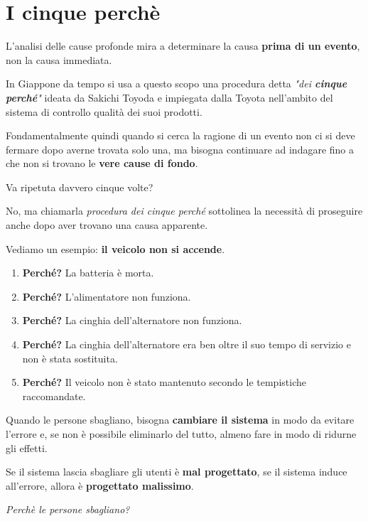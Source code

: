 \documentclass[a4paper,11pt,oneside]{book}
\begin{document}
\section{I cinque perchè}

L'analisi delle cause profonde mira a determinare la causa \textbf{prima di un evento}, non la causa immediata.

In Giappone da tempo si usa a questo scopo una procedura detta \textit{"dei \textbf{cinque perché}"} ideata da Sakichi Toyoda e impiegata dalla Toyota nell'ambito del sistema di controllo qualità dei suoi prodotti.

Fondamentalmente quindi quando si cerca la ragione di un evento non ci si deve fermare dopo averne trovata solo una, ma bisogna continuare ad indagare fino a che non si trovano le \textbf{vere cause di fondo}.

Va ripetuta davvero cinque volte?

No, ma chiamarla \textit{procedura dei cinque perché} sottolinea la necessità di proseguire anche dopo aver trovano una causa apparente.

Vediamo un esempio: \textbf{il veicolo non si accende}.

\begin{enumerate}
	\item \textbf{Perché?} La batteria è morta.
	\item \textbf{Perché?} L'alimentatore non funziona.
	\item \textbf{Perché?} La cinghia dell'alternatore non funziona.
	\item \textbf{Perché?} La cinghia dell'alternatore era ben oltre il suo tempo di servizio e non è stata sostituita.
	\item \textbf{Perché?} Il veicolo non è stato mantenuto secondo le tempistiche raccomandate.
\end{enumerate}

Quando le persone sbagliano, bisogna \textbf{cambiare il sistema} in modo da evitare l'errore
e, se non è possibile eliminarlo del tutto, almeno fare in modo di ridurne gli effetti.

Se il sistema lascia sbagliare gli utenti è \textbf{mal progettato}, se il sistema induce all'errore, allora è \textbf{progettato malissimo}.

\pagebreak

\begin{flushleft}
	\textit{Perchè le persone sbagliano?}
\end{flushleft}
\end{document}
